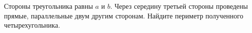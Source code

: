 \begin{ex}
	\begin{condition}
		Стороны треугольника равны \( a  \) и \( b \). Через середину третьей стороны проведены прямые, параллельные двум другим сторонам. Найдите периметр полученного четырехугольника.
	\end{condition}
\end{ex}